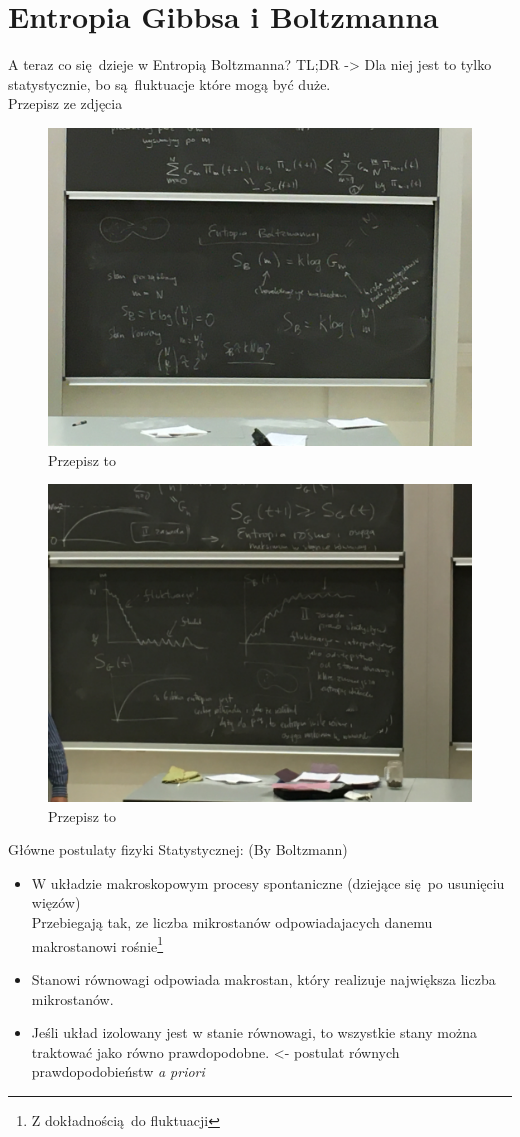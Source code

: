 \documentclass[12pt,a4paper]{report}
\newcommand{\com}[1]{{\color{red} #1}}
\newenvironment{lecture}[1]{\par\medskip
   \noindent\chapter{#1} \rmfamily}{\medskip}
\begin{document}
\begin{lecture}{Entropia Gibbsa i Boltzmanna}
A teraz co się dzieje w Entropią Boltzmanna? TL;DR -> Dla niej jest to tylko statystycznie, bo są fluktuacje które mogą być duże.
\\
\com{Przepisz ze zdjęcia}
\begin{figure}[!ht]
    \centering
    \includegraphics[width=0.8\linewidth, angle=0]{Wyk_4_Rys_1.JPG}
    \caption{\com{Przepisz to}}
    \label{fig:lec_4:cos_1}
\end{figure}

\begin{figure}[!ht]
    \centering
    \includegraphics[width=0.8\linewidth, angle=0]{Wyk_4_Rys_2.JPG}
    \caption{\com{Przepisz to}}
    \label{fig:lec_4:cos_2}
\end{figure}

\FloatBarrier

Główne postulaty fizyki Statystycznej: (By Boltzmann)
\begin{itemize}
    \item W układzie makroskopowym procesy spontaniczne (dziejące się po usunięciu więzów)\\
    Przebiegają tak, ze liczba mikrostanów odpowiadajacych danemu makrostanowi rośnie\footnote{Z dokładnością do fluktuacji}
    \item Stanowi równowagi odpowiada makrostan, który realizuje największa liczba mikrostanów.
    \item Jeśli układ izolowany jest w stanie równowagi, to wszystkie stany można traktować jako równo prawdopodobne. <- postulat równych prawdopodobieństw \textit{a priori}
\end{itemize}

\end{lecture}
\end{document}
